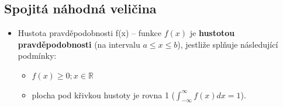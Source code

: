 \subsection{Spojitá náhodná veličina}
\begin{itemize}
	\item Hustota pravděpodobnosti f(x) -- funkce $f(x)$ je \textbf{hustotou pravděpodobnosti} (na intervalu $a \leq x \leq b$), jestliže splňuje následující podmínky:
	\begin{itemize}
		\item $f(x) \geq 0; x \in \mathbb{R}$
		\item plocha pod křivkou hustoty je rovna 1 ($\int_{-\infty}^{\infty} f(x)dx = 1$).
	\end{itemize}
\end{itemize}

